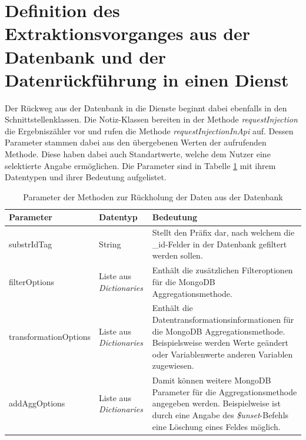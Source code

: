 \section{Definition des Extraktionsvorganges aus der Datenbank und der Datenrückführung in einen Dienst}

Der Rückweg aus der Datenbank in die Dienste beginnt dabei ebenfalls in den Schnittstellenklassen. Die Notiz-Klassen bereiten in der Methode \textit{requestInjection} die Ergebniszähler vor und rufen die Methode \textit{requestInjectionInApi} auf. Dessen Parameter stammen dabei aus den übergebenen Werten der aufrufenden Methode. Diese haben dabei auch Standartwerte, welche dem Nutzer eine selektierte Angabe ermöglichen. Die Parameter sind in Tabelle \ref{tab:params} mit ihrem Datentypen und ihrer Bedeutung aufgelistet.

\begin {table}[H]
\caption{Parameter der Methoden zur Rückholung der Daten aus der Datenbank}
\begin{tabular}{|l|l|p{7.5cm}|}
	\hline
	\textbf{Parameter} & \textbf{Datentyp} & \textbf{Bedeutung}\\
	\hline
	substrIdTag & String & Stellt den Präfix dar, nach welchem die \_id-Felder in der Datenbank gefiltert werden sollen. \\
	\hline
	filterOptions & Liste aus \textit{Dictionaries} & Enthält die zusätzlichen Filteroptionen für die MongoDB Aggregationsmethode.\\
	\hline
	transformationOptions & Liste aus \textit{Dictionaries} & Enthält die Datentransformationsinformationen für die MongoDB Aggregationsmethode. Beispielsweise werden Werte geändert oder Variablenwerte anderen Variablen zugewiesen.\\
	\hline
	addAggOptions & Liste aus \textit{Dictionaries} & Damit können weitere MongoDB Parameter für die Aggregationsmethode angegeben werden. Beispielweise ist durch eine Angabe des \textit{\$unset}-Befehls eine Löschung eines Feldes möglich.\\
	\hline
\end{tabular}
\label{tab:params}
\end{table}

